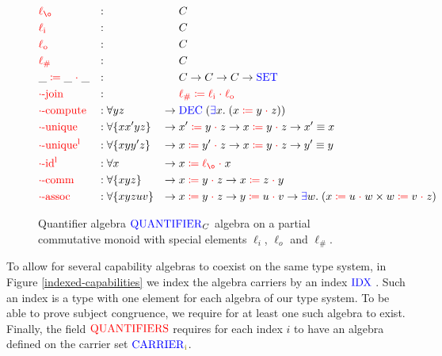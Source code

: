 \documentclass[a4paper,UKenglish,cleveref, autoref, thm-restate,authorcolumns]{lipics-v2019}
\newcommand{\type}[1]{\textcolor{blue}{\mathtt{\operatorname{#1}}}}
\newcommand{\constr}[1]{\textcolor{olive}{\mathtt{\operatorname{#1}}}}
\newcommand{\field}[1]{\textcolor{red}{\mathtt{\operatorname{#1}}}}
\newcommand{\op}[3]{#1 \; \field{\coloneqq} \; #2 \; \field{\cdot} \; #3}
\newcommand{\li}{\field{\ell_i}}
\newcommand{\lo}{\field{\ell_o}}
\newcommand{\lz}{\field{\ell_{\o}}}
\newcommand{\lio}{\field{\ell_{\#}}}
\newcommand{\Set}{\type{SET}}
\newcommand{\Idx}{\type{IDX}\;}
\newcommand{\Carrier}{\type{CARRIER}}
\newcommand{\Quantifier}{\type{QUANTIFIER}}
\begin{document}
\begin{figure}[h]
\begin{equation}
\begin{aligned}
  &\lz                    &:{} &                      &        & C \\
  &\li                    &:{} &                      &        & C \\
  &\lo                    &:{} &                      &        & C \\
  &\lio                   &:{} &                      &        & C \\
  &\op{\_}{\_}{\_}        &:{} &                      &        & C \to C \to C \to \Set \\
  &\field{\cdot-join}     &:{} &                      &        & \op{\lio}{\li}{\lo} \\
  &\field{\cdot-compute}  &:{} &\forall y z           & \to \; & \type{DEC} \; (\type{\exists} x . \; (\op{x}{y}{z})) \\
  &\field{\cdot-unique}   &:{} &\forall \{x x' y z\}  & \to \; & \op{x'}{y}{z} \to \op{x}{y}{z} \to x' \equiv x \\
  &\field{\cdot-unique^l} &:{} &\forall \{x y y' z\}  & \to \; & \op{x}{y'}{z} \to \op{x}{y}{z} \to y' \equiv y \\
  &\field{\cdot-id^l}     &:{} &\forall x             & \to \; & \op{x}{\lz}{x} \\
  &\field{\cdot-comm}     &:{} &\forall \{x y z\}     & \to \; & \op{x}{y}{z} \to \op{x}{z}{y} \\
  &\field{\cdot-assoc}    &:{} &\forall \{x y z u v\} & \to \; & \op{x}{y}{z} \to \op{y}{u}{v} \to \type{\exists} w . \; (\op{x}{u}{w} \times \op{w}{v}{z})
\end{aligned}
\end{equation}
\caption{Quantifier algebra $\Quantifier_C$ algebra on a partial commutative monoid with special elements $\ell_i$, $\ell_o$ and $\ell_\#$.}
\label{capabilities}
\end{figure}

To allow for several capability algebras to coexist on the same type system, in Figure \ref{indexed-capabilities} we index the algebra carriers by an index $\Idx$.
Such an index is a type with one element for each algebra of our type system.
To be able to prove subject congruence, we require for at least one such algebra to exist.
Finally, the field $\field{QUANTIFIERS}$ requires for each index $i$ to have an algebra defined on the carrier set $\constr{\Carrier_i}$.
\end{document}
